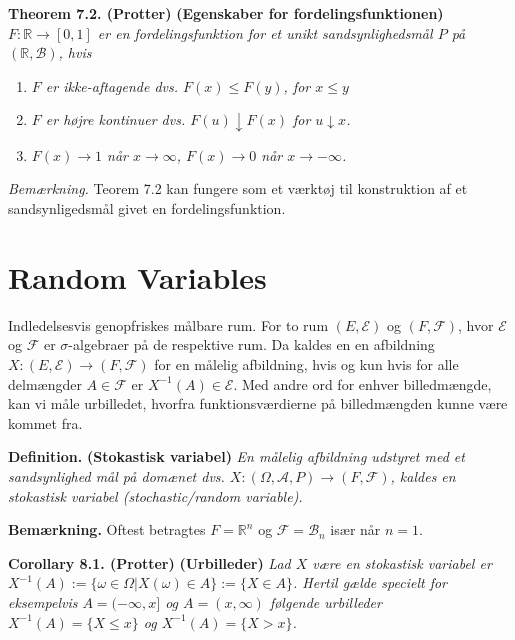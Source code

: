 \documentclass[a4paper,10pt,openany]{book}
\providecommand{\tightlist}{%
 \setlength{\itemsep}{0pt}\setlength{\parskip}{0pt}}
\begin{document}
\textbf{Theorem 7.2. (Protter)} \textbf{(Egenskaber for fordelingsfunktionen)} \emph{\(F : \mathbb{R} \to [0,1]\) er en fordelingsfunktion for et unikt sandsynlighedsmål \(P\) på \((\mathbb{R},\mathcal{B})\), hvis}

\begin{enumerate}
\def\labelenumi{\roman{enumi}.}
\tightlist
\item
  \emph{\(F\) er ikke-aftagende dvs. \(F(x)\le F(y)\), for \(x\le y\)}
\item
  \emph{\(F\) er højre kontinuer dvs. \(F(u)\downarrow F(x)\) for \(u\downarrow x\).}
\item
  \emph{\(F(x)\to 1\) når \(x\to \infty\), \(F(x)\to 0\) når \(x\to -\infty\).}
\end{enumerate}

\emph{Bemærkning.} Teorem 7.2 kan fungere som et værktøj til konstruktion af et sandsynligedsmål givet en fordelingsfunktion.

\hypertarget{random-variables}{%
\section{Random Variables}\label{random-variables}}

Indledelsesvis genopfriskes målbare rum. For to rum \((E,\mathcal{E})\) og \((F,\mathcal{F})\), hvor \(\mathcal{E}\) og \(\mathcal{F}\) er \(\sigma\)-algebraer på de respektive rum. Da kaldes en en afbildning \(X : (E,\mathcal{E})\to(F,\mathcal{F})\) for en målelig afbildning, hvis og kun hvis for alle delmængder \(A\in\mathcal{F}\) er \(X^{-1}(A)\in\mathcal{E}\). Med andre ord for enhver billedmængde, kan vi måle urbilledet, hvorfra funktionsværdierne på billedmængden kunne være kommet fra.

\textbf{Definition.} \textbf{(Stokastisk variabel)} \emph{En målelig afbildning udstyret med et sandsynlighed mål på domænet dvs. \(X : (\Omega,\mathcal{A},P) \to (F,\mathcal{F})\), kaldes en stokastisk variabel (stochastic/random variable).}

\textbf{Bemærkning.} Oftest betragtes \(F=\mathbb{R}^n\) og \(\mathcal{F}=\mathcal{B}_n\) især når \(n=1\).

\textbf{Corollary 8.1. (Protter)} \textbf{(Urbilleder)} \emph{Lad \(X\) være en stokastisk variabel er \(X^{-1}(A):=\{\omega\in\Omega \vert X(\omega)\in A\}:=\{X\in A\}\). Hertil gælde specielt for eksempelvis \(A=(-\infty,x]\) og \(A=(x,\infty)\) følgende urbilleder \(X^{-1}(A)=\{X\le x\}\) og \(X^{-1}(A)=\{X> x\}\).}
\end{document}
